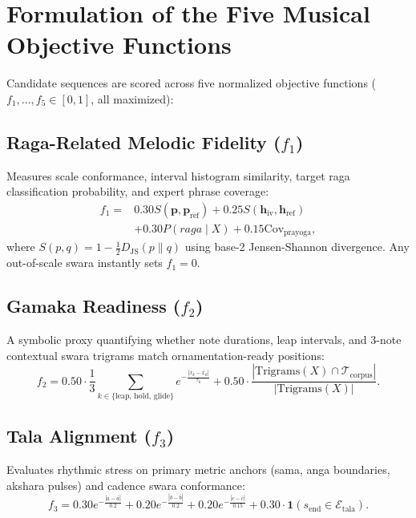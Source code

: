 \documentclass[12pt,a4paper]{report}
\newcommand{\ind}{\mathbf{1}}
\begin{document}
\section{Formulation of the Five Musical Objective Functions}
Candidate sequences are scored across five normalized objective functions ($f_1, \dots, f_5 \in [0, 1]$, all maximized):

\subsection{Raga-Related Melodic Fidelity ($f_1$)}
Measures scale conformance, interval histogram similarity, target raga classification probability, and expert phrase coverage:
\begin{equation}
\begin{split}
 f_1 ={}& 0.30 S(\mathbf{p}, \mathbf{p}_{\text{ref}}) + 0.25 S(\mathbf{h}_{\text{iv}}, \mathbf{h}_{\text{ref}}) \\
       & + 0.30 P(raga \mid X) + 0.15 \text{Cov}_{\text{prayoga}},
\end{split}
\end{equation}
where $S(p, q) = 1 - \frac{1}{2} D_{\text{JS}}(p \parallel q)$ using base-2 Jensen-Shannon divergence. Any out-of-scale swara instantly sets $f_1 = 0$.

\subsection{Gamaka Readiness ($f_2$)}
A symbolic proxy quantifying whether note durations, leap intervals, and 3-note contextual swara trigrams match ornamentation-ready positions:
\begin{equation}
 f_2 = 0.50 \cdot \frac{1}{3} \sum_{k \in \{\text{leap, hold, glide}\}} e^{-\frac{|x_k - \bar{x}_k|}{\tau_k}} + 0.50 \cdot \frac{|\text{Trigrams}(X) \cap \mathcal{T}_{\text{corpus}}|}{|\text{Trigrams}(X)|}.
\end{equation}

\subsection{Tala Alignment ($f_3$)}
Evaluates rhythmic stress on primary metric anchors (sama, anga boundaries, akshara pulses) and cadence swara conformance:
\begin{equation}
 f_3 = 0.30 e^{-\frac{|a - \bar{a}|}{0.2}} + 0.20 e^{-\frac{|b - \bar{b}|}{0.2}} + 0.20 e^{-\frac{|c - \bar{c}|}{0.15}} + 0.30 \cdot \ind(s_{\text{end}} \in \mathcal{E}_{\text{tala}}).
\end{equation}
\end{document}

